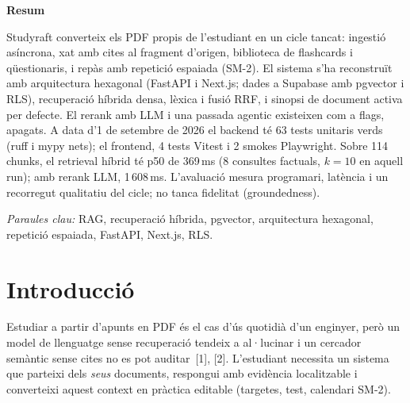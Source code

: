 \documentclass[10pt,a4paper,twoside]{article}
\begin{document}

{\fontsize{12}{14}\selectfont\bfseries Resum\par}
\vspace{4pt}
Studyraft converteix els PDF propis de l'estudiant en un cicle tancat: ingestió asíncrona, xat amb cites al fragment d'origen, biblioteca de flashcards i qüestionaris, i repàs amb repetició espaiada (SM-2).
El sistema s'ha reconstruït amb arquitectura hexagonal (FastAPI i Next.js; dades a Supabase amb pgvector i RLS), recuperació híbrida densa, lèxica i fusió RRF, i sinopsi de document activa per defecte.
El rerank amb LLM i una passada agentic existeixen com a flags, apagats.
A data d'1 de setembre de 2026 el backend té 63 tests unitaris verds (ruff i mypy nets); el frontend, 4 tests Vitest i 2 smokes Playwright.
Sobre 114 chunks, el retrieval híbrid té p50 de 369\,ms (8 consultes factuals, $k=10$ en aquell run); amb rerank LLM, 1\,608\,ms.
L'avaluació mesura programari, latència i un recorregut qualitatiu del cicle; no tanca fidelitat (groundedness).

\vspace{2pt}
{\fontsize{10}{12}\selectfont\textit{Paraules clau:} RAG, recuperació híbrida, pgvector, arquitectura hexagonal, repetició espaiada, FastAPI, Next.js, RLS.\par}

\section{Introducció}
Estudiar a partir d'apunts en PDF és el cas d'ús quotidià d'un enginyer, però un model de llenguatge sense recuperació tendeix a al·lucinar i un cercador semàntic sense cites no es pot auditar~[1], [2].
L'estudiant necessita un sistema que parteixi dels \emph{seus} documents, respongui amb evidència localitzable i converteixi aquest context en pràctica editable (targetes, test, calendari SM-2).
\end{document}
